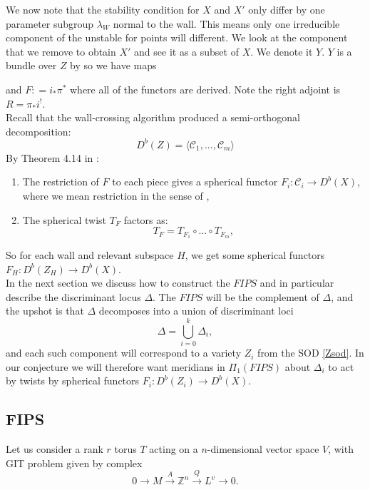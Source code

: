 \documentclass[oneside,reqno]{amsart}
\theoremstyle{definition}
\theoremstyle{definition}
\theoremstyle{definition}
\theoremstyle{definition}
\newcommand{\defeq}{\mathrel{\mathop:}=}
\newcommand{\Z}{\mathbb{Z}}
\begin{document}
We now note that the stability condition for $X$ and $X'$ only differ by one parameter subgroup $\lambda_W$ normal to the wall. This means only one irreducible component of the unstable for points will different. We look at the component that we remove to obtain $X'$ and see it as a subset of $X$. We denote it $Y$. $Y$ is a bundle over $Z$ by \cite{bialynick} so we have maps
\begin{center}
\end{center}
and $F \defeq i_* \pi^*$ where all of the functors are derived. Note the right adjoint is $R = \pi_* i^!$. \\
\newline
Recall that the wall-crossing algorithm produced a semi-orthogonal decomposition:
$$D^b(Z) =\langle \mathcal{C}_1,...,\mathcal{C}_m\rangle $$
By Theorem 4.14 in \cite{gitauto}:
\begin{enumerate}
    \item The restriction of $F$ to each piece gives a spherical functor $F_i : \mathcal{C}_i \to D^b(X)$, where we mean restriction in the sense of \cite[Chapter 1]{huybrechts},
    \item The spherical twist $T_F$ factors as:
    \begin{equation}
        \label{twistfactors}
        T_F = T_{F_1} \circ \dots \circ T_{F_m},
    \end{equation}
\end{enumerate}
So for each wall and relevant subspace $H$, we get some spherical functors $F_H :D^b(Z_H) \to D^b(X)$.\\
\newline
In the next section we discuss how to construct the $FIPS$ and in particular describe the discriminant locus $\Delta$. The $FIPS$ will be the complement of $\Delta$, and the upshot is that $\Delta$ decomposes into a union of discriminant loci 
$$
\Delta = \bigcup_{i=0}^k \Delta_i,
$$
and each such component will correspond to a variety $Z_i$ from the SOD \eqref{Zsod}. In our conjecture we will therefore want meridians in $\Pi_1(FIPS)$ about $\Delta_i$ to act by twists by spherical functors $F_i :D^b(Z_i) \to D^b(X)$.

\subsection{FIPS}
\label{fips}
Let us consider a rank $r$ torus $T$ acting on a $n$-dimensional vector space $V$, with GIT problem given by complex
$$
0 \xrightarrow[]{} M \xrightarrow[]{A} \Z^n \xrightarrow[]{Q} L^v \xrightarrow[]{} 0.
$$ 
\end{document}
